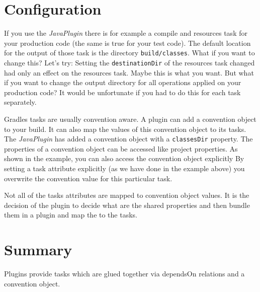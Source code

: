 \section{Configuration} %
\label{sec:configuration}
If you use the \emph{JavaPlugin} there is for example a compile and resources task for your production code (the same is true for your test code). The default location for the output of those task is the directory \texttt{build/classes}. What if you want to change this? Let's try:
Setting the \texttt{destinationDir} of the resources task changed had only an effect on the resources task. Maybe this is what you want. But what if you want to change the output directory for all operations applied on your production code? It would be unfortunate if you had to do this for each task separately. 

Gradles tasks are usually convention aware. A plugin can add a convention object to your build. It can also map the values of this convention object to its tasks.
The \emph{JavaPlugin} has added a convention object with a \texttt{classesDir} property. The properties of a convention object can be accessed like project properties. As shown in the example, you can also access the convention object explicitly
By setting a task attribute explicitly (as we have done in the example above) you overwrite the convention value for this particular task.

Not all of the tasks attributes are mapped to convention object values. It is the decision of the plugin to decide what are the shared properties and then bundle them in a plugin and map the to the tasks.
\section{Summary} %
\label{sec:summary}
Plugins provide tasks which are glued together via dependsOn relations and a convention object. 
